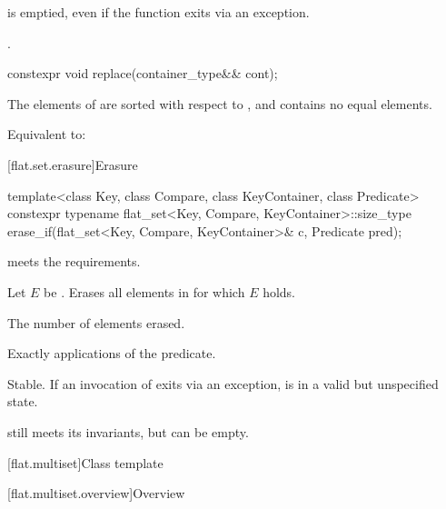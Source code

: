 \begin{itemdescr}
\pnum
\ensures
{} is emptied, even if the function exits via an exception.

\pnum
\returns
{}.
\end{itemdescr}

%
\begin{itemdecl}
constexpr void replace(container_type&& cont);
\end{itemdecl}

\begin{itemdescr}
\pnum
\expects
The elements of  are sorted with respect to , and
 contains no equal elements.

\pnum
\effects
Equivalent to: 
\end{itemdescr}

[flat.set.erasure]{Erasure}

%
\begin{itemdecl}
template<class Key, class Compare, class KeyContainer, class Predicate>
  constexpr typename flat_set<Key, Compare, KeyContainer>::size_type
    erase_if(flat_set<Key, Compare, KeyContainer>& c, Predicate pred);
\end{itemdecl}

\begin{itemdescr}
\pnum
\expects
{} meets the  requirements.

\pnum
\effects
Let $E$ be .
Erases all elements  in  for which $E$ holds.

\pnum
\returns
The number of elements erased.

\pnum
\complexity
Exactly  applications of the predicate.

\pnum
\remarks
Stable.
If an invocation of  exits via an exception,
 is in a valid but unspecified state.
\begin{note}
 still meets its invariants, but can be empty.
\end{note}
\end{itemdescr}

[flat.multiset]{Class template }

[flat.multiset.overview]{Overview}

